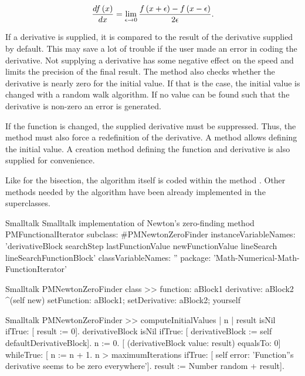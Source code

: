 \begin{equation}
\label{eq:derivative} {df\left(x\right)\over dx}=\lim_{\epsilon\to
0}{f\left(x+\epsilon\right)-f\left(x-\epsilon\right)\over
2\epsilon}.
\end{equation}

If a derivative is supplied, it is compared to the result of the
derivative supplied by default. This may save a lot of trouble if
the user made an error in coding the derivative. Not supplying a
derivative has some negative effect on the speed and limits the
precision of the final result. The method  also checks whether the derivative is nearly
zero for the initial value. If that is the case, the initial value
is changed with a random walk algorithm. If no value can be found
such that the derivative is non-zero an error is generated.

If the function is changed, the supplied derivative must be
suppressed.
Thus, the method  must also force a
redefinition of the derivative.
A method allows defining the initial value. A creation method defining the function and
derivative is also supplied for convenience.

Like for the bisection, the algorithm itself is coded within the
method . Other methods needed by the
algorithm have been already implemented in the superclasses.

\begin{listing}[label=lst:newtonZero]{Smalltalk}
{Smalltalk implementation of Newton's zero-finding method}
PMFunctionalIterator subclass: #PMNewtonZeroFinder
 instanceVariableNames: 'derivativeBlock searchStep lastFunctionValue  newFunctionValue lineSearch lineSearchFunctionBlock'
   classVariableNames: ''
   package: 'Math-Numerical-Math-FunctionIterator'
\end{listing}

\begin{displaycode}{Smalltalk}
PMNewtonZeroFinder class >> function: aBlock1 derivative: aBlock2
    ^(self new) setFunction: aBlock1; setDerivative: aBlock2; 
                                                              yourself
\end{displaycode}

\begin{displaycode}{Smalltalk}
PMNewtonZeroFinder >> computeInitialValues
    | n |
    result isNil
        ifTrue: [ result := 0].
    derivativeBlock isNil
        ifTrue: [ derivativeBlock := self defaultDerivativeBlock].
    n := 0.
    [ (derivativeBlock value: result) equalsTo: 0]
        whileTrue: [ n := n + 1.
                     n > maximumIterations
                        ifTrue: [ self error: 'Function''s derivative 
                                        seems to be zero everywhere'].
                     result := Number random + result].
\end{displaycode}

